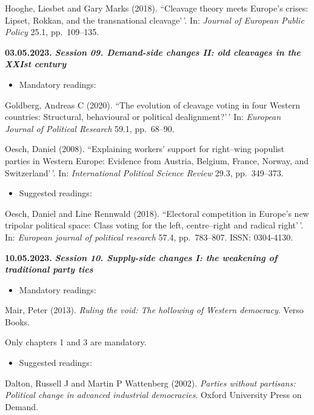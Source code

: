 \documentclass[
  12pt,
]{article}
\providecommand{\tightlist}{%
  \setlength{\itemsep}{0pt}\setlength{\parskip}{0pt}}
\begin{document}
Hooghe, Liesbet and Gary Marks (2018). ``Cleavage theory meets Europe's
crises: Lipset, Rokkan, and the transnational cleavage'\,'. In:
\emph{Journal of European Public Policy} 25.1, pp.~109--135.

\textbf{03.05.2023.} \textbf{\emph{Session 09. Demand-side changes II:
old cleavages in the XXIst century}}

\begin{itemize}
\tightlist
\item
  Mandatory readings:
\end{itemize}

Goldberg, Andreas C (2020). ``The evolution of cleavage voting in four
Western countries: Structural, behavioural or political dealignment?'\,'
In: \emph{European Journal of Political Research} 59.1, pp.~68--90.

Oesch, Daniel (2008). ``Explaining workers' support for right--wing
populist parties in Western Europe: Evidence from Austria, Belgium,
France, Norway, and Switzerland'\,'. In:
\emph{International Political Science Review} 29.3, pp.~349--373.

\begin{itemize}
\tightlist
\item
  Suggested readings:
\end{itemize}

Oesch, Daniel and Line Rennwald (2018). ``Electoral competition in
Europe's new tripolar political space: Class voting for the left,
centre--right and radical right'\,'. In:
\emph{European journal of political research} 57.4, pp.~783--807. ISSN:
0304-4130.

\textbf{10.05.2023.} \textbf{\emph{Session 10. Supply-side changes I:
the weakening of traditional party ties}}

\begin{itemize}
\tightlist
\item
  Mandatory readings:
\end{itemize}

Mair, Peter (2013).
\emph{Ruling the void: The hollowing of Western democracy}. Verso Books.

Only chapters 1 and 3 are mandatory.

\begin{itemize}
\tightlist
\item
  Suggested readings:
\end{itemize}

Dalton, Russell J and Martin P Wattenberg (2002).
\emph{Parties without partisans: Political change in advanced industrial democracies}.
Oxford University Press on Demand.
\end{document}
